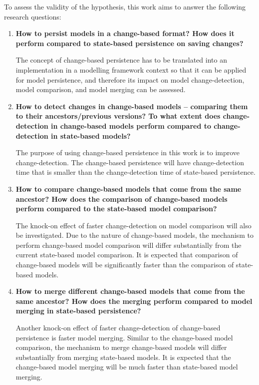To assess the validity of the hypothesis, this work aims to answer the following research questions: 
\begin{enumerate} 
\item \textbf{How to persist models in a change-based format? How does it perform compared to state-based persistence on saving changes?} 

The concept of change-based persistence has to be translated into an implementation in a modelling framework context so that it can be applied for model persistence, and therefore its impact on model change-detection, model comparison, and model merging can be assessed.

\item \textbf{How to detect changes in change-based models -- comparing them to their ancestors/previous versions? To what extent does change-detection in change-based models perform compared to change-detection in state-based models?} 

The purpose of using change-based persistence in this work is to improve change-detection. The change-based persistence will have change-detection time that is smaller than the change-detection time of state-based persistence.        

\item \textbf{How to compare change-based models that come from the same ancestor? How does the comparison of change-based models perform compared to the state-based model comparison?} 

The knock-on effect of faster change-detection on model comparison will also be investigated. Due to the nature of change-based models, the mechanism to perform change-based model comparison will differ substantially from the current state-based model comparison. It is expected that comparison of change-based models will be significantly faster than the comparison of state-based models.

\item \textbf{How to merge different change-based models that come from the same ancestor? How does the merging perform compared to model merging in state-based persistence?}

Another knock-on effect of faster change-detection of change-based persistence is faster model merging. Similar to the change-based model comparison, the mechanism to merge change-based models will differ substantially from merging state-based models. It is expected that the change-based model merging will be much faster than state-based model merging.   

\end{enumerate}

